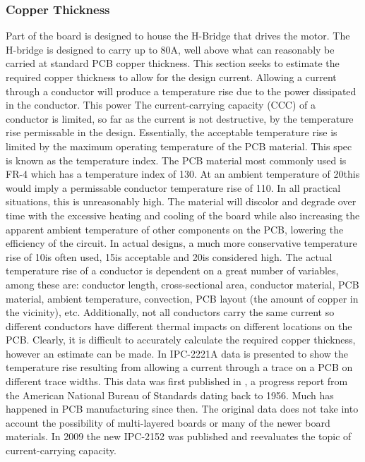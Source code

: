 \subsubsection{Copper Thickness}
Part of the board is designed to house the H-Bridge that drives the motor.
The H-bridge is designed to carry up to 80A, well above what can reasonably be carried at standard PCB copper thickness.
This section seeks to estimate the required copper thickness to allow for the design current.
Allowing a current through a conductor will produce a temperature rise due to the power dissipated in the conductor.
This power
The current-carrying capacity (CCC) of a conductor is limited, so far as the current is not destructive, by the temperature rise permissable in the design.
Essentially, the acceptable temperature rise is limited by the maximum operating temperature of the PCB material.
This spec is known as the temperature index.
The PCB material most commonly used is FR-4 which has a temperature index of 130\degree.
At an ambient temperature of 20\degree this would imply a permissable conductor temperature rise of 110\degree.
In all practical situations, this is unreasonably high.
The material will discolor and degrade over time with the excessive heating and cooling of the board while also increasing the apparent ambient temperature of other components on the PCB, lowering the efficiency of the circuit.
In actual designs, a much more conservative temperature rise of 10\degree is often used, 15\degree is acceptable and 20\degree is considered high.
The actual temperature rise of a conductor is dependent on a great number of variables, among these are: conductor length, cross-sectional area, conductor material, PCB material, ambient temperature, convection, PCB layout (the amount of copper in the vicinity), etc.
Additionally, not all conductors carry the same current so different conductors have different thermal impacts on different locations on the PCB.
Clearly, it is difficult to accurately calculate the required copper thickness, however an estimate can be made.
In IPC-2221A \cite{ipc2221} data is presented to show the temperature rise resulting from allowing a current through a trace on a PCB on different trace widths.
This data was first published in \cite{conduct}, a progress report from the American National Bureau of Standards dating back to 1956.
Much has happened in PCB manufacturing since then. 
The original data does not take into account the possibility of multi-layered boards or many of the newer board materials.
In 2009 the new IPC-2152 \cite{ipc2152} was published and reevaluates the topic of current-carrying capacity.
